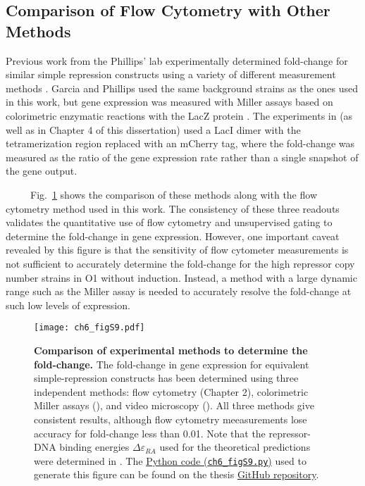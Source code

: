 \documentclass[12pt]{caltech_thesis}
\begin{document}
\hypertarget{comparison-of-flow-cytometry-with-other-methods}{%
\subsection{Comparison of Flow Cytometry with Other
Methods}\label{comparison-of-flow-cytometry-with-other-methods}}

Previous work from the Phillips' lab experimentally determined
fold-change for similar simple repression constructs using a variety of
different measurement methods \autocite{garcia2011b}. Garcia and
Phillips used the same background strains as the ones used in this work,
but gene expression was measured with Miller assays based on
colorimetric enzymatic reactions with the LacZ protein
\autocite{garcia2011}. The experiments in \textcite{brewster2014} (as
well as in Chapter 4 of this dissertation) used a LacI dimer with the
tetramerization region replaced with an mCherry tag, where the
fold-change was measured as the ratio of the gene expression rate rather
than a single snapshot of the gene output.

~~~~~Fig.~\ref{fig:new_old_comparison} shows the comparison of these
methods along with the flow cytometry method used in this work. The
consistency of these three readouts validates the quantitative use of
flow cytometry and unsupervised gating to determine the fold-change in
gene expression. However, one important caveat revealed by this figure
is that the sensitivity of flow cytometer measurements is not sufficient
to accurately determine the fold-change for the high repressor copy
number strains in O1 without induction. Instead, a method with a large
dynamic range such as the Miller assay is needed to accurately resolve
the fold-change at such low levels of expression.

\hypertarget{fig:new_old_comparison}{%
\begin{figure}
\centering
\texttt{[image: ch6\_figS9.pdf]}
\caption[{Comparison of experimental methods to determine the
fold-change in gene expression.}]{\textbf{Comparison of experimental
methods to determine the fold-change.} The fold-change in gene
expression for equivalent simple-repression constructs has been
determined using three independent methods: flow cytometry (Chapter 2),
colorimetric Miller assays (\textcite{garcia2011}), and video microscopy
(\textcite{brewster2014}). All three methods give consistent results,
although flow cytometry meeasurements lose accuracy for fold-change less
than 0.01. Note that the repressor-DNA binding energies
\(\Delta\varepsilon_{RA}\) used for the theoretical predictions were
determined in \textcite{garcia2011}. The
\href{https://github.com/gchure/phd/blob/master/src/chapter_06/code/ch6_figS9.py}{Python
code (\texttt{ch6\_figS9.py})} used to generate this figure can be found
on the thesis \href{https://github.com/gchure/phd}{GitHub repository}.}
\label{fig:new_old_comparison}
\end{figure}
}
\end{document}
